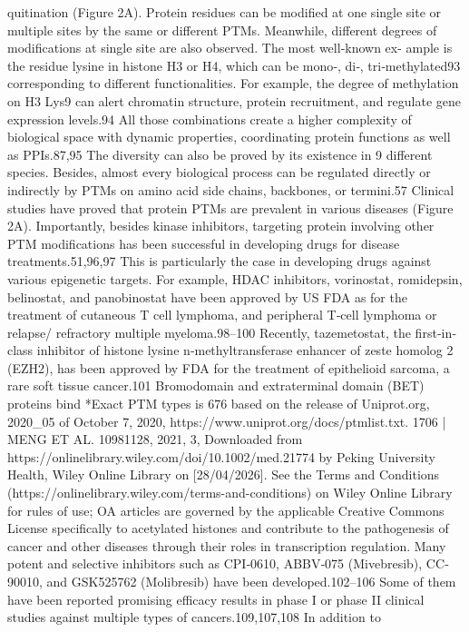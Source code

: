 quitination (Figure 2A). Protein residues can be modified at one single site or multiple sites by the same or different
PTMs. Meanwhile, different degrees of modifications at single site are also observed. The most well‐known ex-
ample is the residue lysine in histone H3 or H4, which can be mono‐, di‐, tri‐methylated93 corresponding to
different functionalities. For example, the degree of methylation on H3 Lys9 can alert chromatin structure, protein
recruitment, and regulate gene expression levels.94 All those combinations create a higher complexity of biological
space with dynamic properties, coordinating protein functions as well as PPIs.87,95 The diversity can also be proved
by its existence in 9 different species. Besides, almost every biological process can be regulated directly or
indirectly by PTMs on amino acid side chains, backbones, or termini.57
Clinical studies have proved that protein PTMs are prevalent in various diseases (Figure 2A). Importantly,
besides kinase inhibitors, targeting protein involving other PTM modifications has been successful in developing
drugs for disease treatments.51,96,97 This is particularly the case in developing drugs against various epigenetic
targets. For example, HDAC inhibitors, vorinostat, romidepsin, belinostat, and panobinostat have been approved
by US FDA as for the treatment of cutaneous T cell lymphoma, and peripheral T‐cell lymphoma or relapse/
refractory
multiple
myeloma.98–100
Recently,
tazemetostat,
the
first‐in‐class
inhibitor
of
histone
lysine
n‐methyltransferase enhancer of zeste homolog 2 (EZH2), has been approved by FDA for the treatment of
epithelioid sarcoma, a rare soft tissue cancer.101 Bromodomain and extraterminal domain (BET) proteins bind
*Exact PTM types is 676 based on the release of Uniprot.org, 2020\_05 of October 7, 2020, https://www.uniprot.org/docs/ptmlist.txt.
1706 |
MENG ET AL.
 10981128, 2021, 3, Downloaded from https://onlinelibrary.wiley.com/doi/10.1002/med.21774 by Peking University Health, Wiley Online Library on [28/04/2026]. See the Terms and Conditions (https://onlinelibrary.wiley.com/terms-and-conditions) on Wiley Online Library for rules of use; OA articles are governed by the applicable Creative Commons License
specifically to acetylated histones and contribute to the pathogenesis of cancer and other diseases through their
roles in transcription regulation. Many potent and selective inhibitors such as CPI‐0610, ABBV‐075 (Mivebresib),
CC‐90010, and GSK525762 (Molibresib) have been developed.102–106 Some of them have been reported promising
efficacy results in phase I or phase II clinical studies against multiple types of cancers.109,107,108 In addition to
